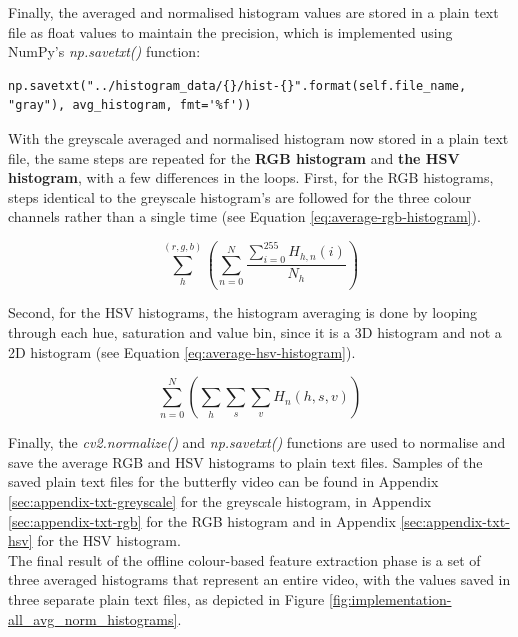 Finally, the averaged and normalised histogram values are stored in a plain text file as float values to maintain the precision, which is implemented using NumPy's \textit{np.savetxt()} function:

\begin{lstlisting}
np.savetxt("../histogram_data/{}/hist-{}".format(self.file_name, "gray"), avg_histogram, fmt='%f'))
\end{lstlisting}

With the greyscale averaged and normalised histogram now stored in a plain text file, the same steps are repeated for the \textbf{RGB histogram} and \textbf{the HSV histogram}, with a few differences in the loops. First, for the RGB histograms, steps identical to the greyscale histogram's are followed for the three colour channels rather than a single time (see Equation \ref{eq:average-rgb-histogram}).

\begin{equation}
\label{eq:average-rgb-histogram}
    \sum_{h}^{(r,g,b)} (\sum_{n=0}^{N} \frac{\sum_{i=0}^{255} H_{h,n}(i)}{N_h})
\end{equation}

Second, for the HSV histograms, the histogram averaging is done by looping through each hue, saturation and value bin, since it is a 3D histogram and not a 2D histogram (see Equation \ref{eq:average-hsv-histogram}).

\begin{equation}
\label{eq:average-hsv-histogram}
    \sum_{n=0}^{N}(\sum_h \sum_s \sum_v H_n(h,s,v))
\end{equation}

Finally, the \textit{cv2.normalize()} and \textit{np.savetxt()} functions are used to normalise and save the average RGB and HSV histograms to plain text files. Samples of the saved plain text files for the butterfly video can be found in Appendix \ref{sec:appendix-txt-greyscale} for the greyscale histogram, in Appendix \ref{sec:appendix-txt-rgb} for the RGB histogram and in Appendix \ref{sec:appendix-txt-hsv} for the HSV histogram.\\

The final result of the offline colour-based feature extraction phase is a set of three averaged histograms that represent an entire video, with the values saved in three separate plain text files, as depicted in Figure \ref{fig:implementation-all_avg_norm_histograms}.\\

